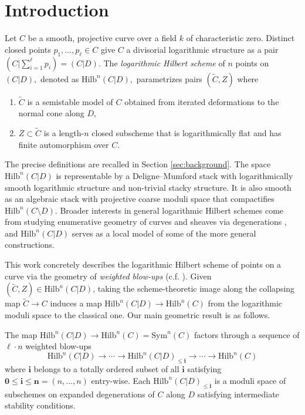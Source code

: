 \documentclass[10.5pt]{amsart}
\theoremstyle{definition}
\newenvironment{customthm}[1]
  {\renewcommand\theinnercustomthm{#1}\innercustomthm}
  {\endinnercustomthm}
\theoremstyle{definition}
\theoremstyle{definition}
\theoremstyle{definition}
\newcommand{\Hilb}{\mathrm{Hilb}}
\newcommand{\Sym}{\mathrm{Sym}}
\newcommand{\bi}{\boldsymbol{i}}
\begin{document}
\section{Introduction}
Let $C$ be a smooth, projective curve over a field $k$ of characteristic zero. Distinct closed points $p_1,\dots,p_\ell\in C$ give $C$ a divisorial logarithmic structure as a pair $(C| \sum_{i=1}^\ell p_i) = (C|D).$ The \emph{logarithmic Hilbert scheme} of $n$ points on $(C|D),$ denoted as $\Hilb^n(C|D),$ parametrizes pairs $(\tilde{C}, Z)$ where 
\begin{enumerate}
\item $\tilde{C}$ is a semistable model of $C$ obtained from iterated deformations to the normal cone along $D,$
\item $Z\subset \tilde{C}$ is a length-$n$ closed subscheme that is logarithmically flat and has finite automorphism {over $C$}.
\end{enumerate} The precise definitions are recalled in Section \ref{sec:background}. The space $\Hilb^n(C|D)$ is representable by a Deligne--Mumford stack with logarithmically smooth logarithmic structure {and non-trivial stacky structure}. It is also smooth as an algebraic stack with projective coarse moduli space that compactifies $\Hilb^n(C\setminus D).$ {Broader interests in general logarithmic Hilbert schemes come from studying enumerative geometry of curves and sheaves via degenerations \cite{lw15, MR20, logquot, MR25}, and $\Hilb^n(C|D)$ serves as a local model of some of the more general constructions.}

This work concretely describes the logarithmic Hilbert scheme of points on a curve via the geometry of \textit{weighted blow-ups} (c.f. \cite{quek-rydh-weighted-blow-up}). Given $(\tilde{C}, Z)\in \Hilb^n(C|D)$, taking the scheme-theoretic image along the collapsing map $\tilde{C}\to C$ induces a map $\Hilb^n(C|D)\to \Hilb^n(C)$ from the logarithmic moduli space to the classical one. Our main geometric result is as follows.

\begin{customthm}{\ref{thm:main}}
  The map $\Hilb^n(C|D)\to \Hilb^n(C) = \Sym^n(C)$ factors through a sequence of $\ell \cdot n$ weighted blow-ups $$\Hilb^n(C|D)\to \cdots  \to \Hilb^n(C|D)_{\leq \bi}  \to \cdots \to \Hilb^n(C)$$ where $\bi$ belongs to a totally ordered subset of all  $\bi$ satisfying $\mathbf{0}\leq \bi\leq \mathbf{n} = (n,\dots,n)$ entry-wise. Each $\Hilb^n(C|D)_{\leq \bi}$ is {a moduli space} of subschemes on expanded degenerations of $C$ along $D$ satisfying intermediate stability conditions.
\end{customthm}
\end{document}
